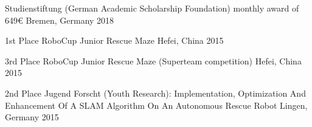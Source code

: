 

\begin{cvhonors}

  \cvhonor
    {Studienstiftung (German Academic Scholarship Foundation)} %
    {monthly award of 649€}
    {Bremen, Germany} %
    {2018} %

\begin{comment}
  \cvhonor
    {Deutschlandstipendium (German Scholarship)} %
    {monthly award of 300€}
    {Bremen, Germany} %
    {2016} %
\end{comment}
  \cvhonor
    {1st Place} %
    {RoboCup Junior Rescue Maze} %
    {Hefei, China} %
    {2015} %

  \cvhonor
    {3rd Place} %
    {RoboCup Junior Rescue Maze (Superteam competition)} %
    {Hefei, China} %
    {2015} %

  \cvhonor
    {2nd Place} %
    {Jugend Forscht (Youth Research): Implementation, Optimization And Enhancement Of A SLAM Algorithm On An Autonomous Rescue Robot} %
    {Lingen, Germany} %
    {2015} %
\begin{comment}
  \cvhonor
    {1st Place} %
    {Dr. Hans Riegel Award: Development And Implementation Of An Algorithm For The Self-Localization Of An Autonomous Rescue Robot} %
    {Oldenburg, Germany} %
    {2014} %

  \cvhonor
    {3rd Place} %
    {RoboCup Junior Rescue Maze (Superteam competition)} %
    {Joao Pessoa, Brazil} %
    {2014} %

  \cvhonor
    {1st Place} %
    {RoboCup Junior Rescue Maze (Superteam competition)} %
    {Mexico-City, Mexico} %
    {2012} %
\end{comment}
\end{cvhonors}
